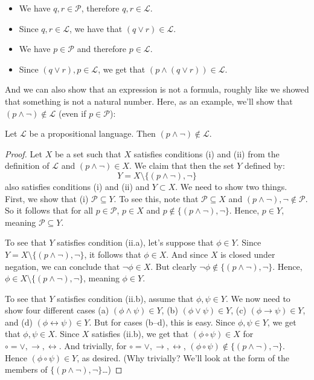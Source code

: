 \begin{enumerate}[\thesection.1]
\begin{itemize}
		\item We have $q,r\in\mathcal{P}$, therefore $q,r\in\mathcal{L}$.
		
		\item Since $q,r\in\mathcal{L}$, we have that $(q\lor r)\in\mathcal{L}$.
		
		\item We have $p\in\mathcal{P}$ and therefore $p\in\mathcal{L}$.
		
		\item Since $(q\lor r), p\in\mathcal{L}$, we get that $(p\land (q\lor r))\in\mathcal{L}$.
	
	\end{itemize} 
And we can also show that an expression is not a formula, roughly like we showed that something is not a natural number. Here, as an example, we'll show that $(p\land\neg)\notin\mathcal{L}$ (even if $p\in\mathcal{P}$):

	\begin{proposition}
	Let $\mathcal{L}$ be a propositional language. Then $(p\land \neg)\notin\mathcal{L}$.
	\end{proposition}
	\begin{proof}
	Let $X$ be a set such that $X$ satisfies conditions (i) and (ii) from the definition of $\mathcal{L}$ and $(p\land \neg)\in X$. We claim that then the set $Y$ defined by: \[Y=X\setminus \{(p\land \neg), \neg\}\] also satisfies conditions (i) and (ii) and $Y\subset X$. We need to show two things. First, we show that (i) $\mathcal{P}\subseteq Y$. To see this, note that $\mathcal{P}\subseteq X$ and $(p\land \neg), \neg\notin\mathcal{P}$. So it follows that for all $p\in\mathcal{P}$, $p\in X$ and $p\notin  \{(p\land \neg), \neg\}$. Hence, $p\in Y$, meaning $\mathcal{P}\subseteq Y$.
	
	To see that $Y$ satisfies condition (ii.a), let's suppose that $\phi\in Y$. Since $Y= X\setminus \{(p\land \neg), \neg\}$, it follows that $\phi\in X$. And since $X$ is closed under negation, we can conclude that $\neg\phi\in X$. But clearly $\neg \phi\notin \{(p\land \neg), \neg\}$. Hence, $\phi\in X\setminus  \{(p\land \neg), \neg\}$, meaning $\phi\in Y$.
	
	To see that $Y$ satisfies condition (ii.b), assume that $\phi,\psi\in Y$. We now need to show four different cases (a) $(\phi\land\psi)\in Y$, (b) $(\phi\lor\psi)\in Y$, (c) $(\phi\to\psi)\in Y$, and (d) $(\phi\leftrightarrow\psi)\in Y$. But for cases (b--d), this is easy. Since $\phi,\psi\in Y$, we get that $\phi,\psi\in X$. Since $X$ satisfies (ii.b), we get that $(\phi\circ\psi)\in X$ for $\circ=\lor,\to,\leftrightarrow$. And trivially, for  $\circ=\lor,\to,\leftrightarrow$, $(\phi\circ\psi)\notin \{(p\land \neg), \neg\}$. Hence $(\phi\circ\psi)\in Y$, as desired. (Why trivially? We'll look at the form of the members of $\{(p\land \neg), \neg\}$\dots)
	

\end{proof}
\end{enumerate}
